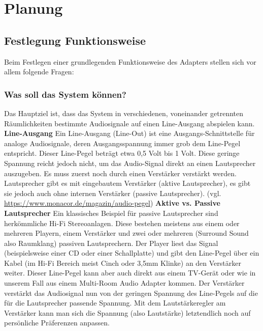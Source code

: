 \documentclass[11pt, twoside]{article}
\begin{document}
\section{Planung}
\subsection{Festlegung Funktionsweise}
Beim Festlegen einer grundlegenden Funktionsweise des Adapters stellen sich vor allem folgende Fragen:
\subsubsection{Was soll das System können?}
Das Hauptziel ist, dass das System in verschiedenen, voneinander getrennten Räumlichkeiten bestimmte Audiosignale auf einen Line-Ausgang abspielen kann.
\vspace{4mm}\newline
\textbf{Line-Ausgang}\newline
Ein Line-Ausgang (Line-Out) ist eine Ausgangs-Schnittstelle für analoge Audiosignale, deren Ausgangsspannung immer grob dem Line-Pegel entspricht. Dieser \glqq Line-Pegel beträgt etwa 0,5 Volt bis 1 Volt\grqq{}. \newline
Diese geringe Spannung reicht jedoch nicht, um das Audio-Signal direkt an einen Lautsprecher auszugeben. Es muss zuerst noch durch einen Verstärker verstärkt werden. Lautsprecher gibt es mit eingebautem Verstärker (aktive Lautsprecher), es gibt sie jedoch auch ohne internen Verstärker (passive Lautsprecher).
\vspace{4mm}\newline
(vgl. \url{https://www.monacor.de/magazin/audio-pegel})
\vspace{4mm}\newline
\textbf{Aktive vs. Passive Lautsprecher}\newline
Ein klassisches Beispiel für passive Lautsprecher sind herkömmliche Hi-Fi Stereoanlagen. Diese bestehen meistens aus einem oder mehreren Playern, einem Verstärker und zwei oder mehreren (Surround Sound also Raumklang) passiven Lautsprechern. Der Player liest das Signal (beispielsweise einer CD oder einer Schallplatte) und gibt den Line-Pegel über ein Kabel (im Hi-Fi Bereich meist Cinch oder 3,5mm Klinke) an den Verstärker weiter. Dieser Line-Pegel kann aber auch direkt aus einem TV-Gerät oder wie in unserem Fall aus einem Multi-Room Audio Adapter kommen. Der Verstärker verstärkt das Audiosignal nun von der geringen Spannung des Line-Pegels auf die für die Lautsprecher passende Spannung. Mit dem Lautstärkeregler am Verstärker kann man sich die Spannung (also Lautstärke) letztendlich noch auf persönliche Präferenzen anpassen. \newline
\end{document}
